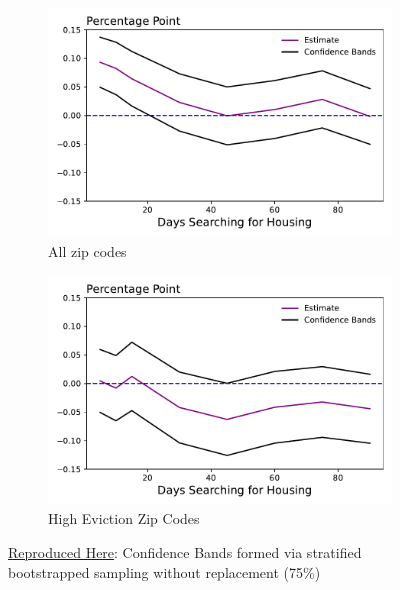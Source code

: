 \documentclass[a4paper,12pt]{article}
\begin{document}
\begin{figure}[htbp]
\centering
\begin{subfigure}{.48\textwidth}
    \centering
    \includegraphics[width=.95\linewidth]{figures/rtc/results/cceh/diff_in_mean_False_False.pdf}
    \caption{All zip codes}
    \label{SUBFIGURE LABEL 3}
\end{subfigure}
\begin{subfigure}{.48\textwidth}
    \centering
    \includegraphics[width=.95\linewidth]{figures/rtc/results/cceh/diff_in_mean_True_False.pdf}
    \caption{High Eviction Zip Codes}
    \label{SUBFIGURE LABEL 4}
\end{subfigure}
\caption{ \href{https://github.com/pharringtonp19/evictions/blob/main/scripts/cceh/primary/diff_n_mean_rrh.py}{Reproduced Here}: Confidence Bands formed via stratified bootstrapped sampling without replacement (75\%)}
\label{FIGURE LABEL}
\end{figure}
\end{document}
